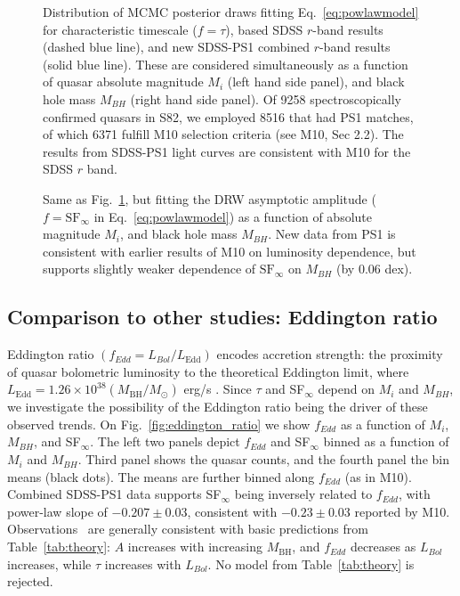 \documentclass[twocolumn]{aastex62}
\begin{document}
\begin{figure*} 
	\caption{Distribution of MCMC posterior draws fitting Eq.~\ref{eq:powlawmodel} for characteristic timescale ($f=\tau$), based SDSS $r$-band results (dashed blue line), and new SDSS-PS1 combined $r$-band results (solid blue line). These are considered simultaneously as a function of quasar absolute magnitude $M_{i}$ (left hand side panel), and black hole mass $M_{BH}$ (right hand side panel). Of 9258 spectroscopically confirmed quasars in S82, we employed 8516 that had PS1 matches, of which 6371  fulfill M10 selection criteria (see M10, Sec 2.2). The results from SDSS-PS1 light curves are consistent with M10 for the SDSS $r$ band. }
	\label{fig:drw_tau_posterior}
\end{figure*} 


\begin{figure*}
	\caption{Same as Fig.~\ref{fig:drw_tau_posterior}, but fitting the DRW asymptotic amplitude ($f = \mathrm{SF}_{\infty}$ in Eq.~\ref{eq:powlawmodel})  as a function of absolute magnitude $M_{i}$, and black hole mass $M_{BH}$. New data from PS1 is consistent with earlier results of M10 on luminosity dependence, but supports slightly weaker dependence of $\mathrm{SF}_{\infty}$ on $M_{BH}$ (by 0.06 dex).}
	\label{fig:drw_sf_posterior}
\end{figure*} 

 

\subsection{Comparison to other studies: Eddington ratio}

Eddington ratio $(f_{Edd} {=} L_{Bol}/L_{\mathrm{Edd}})$ encodes accretion strength: the proximity of quasar bolometric luminosity to the theoretical Eddington limit, where $L_{\mathrm{Edd}} {=} 1.26 {\times} 10^{38} (M_{\mathrm{BH}} / M_{\odot})$ erg/s \citep{shen2011}. Since $\tau$ and SF$_{\infty}$ depend on $M_{i}$ and $M_{BH}$, we investigate the possibility of the Eddington ratio being the driver of these observed trends. On Fig.~\ref{fig:eddington_ratio} we show $f_{Edd} $ as a function of $M_{i}$, $M_{BH}$, and SF$_{\infty}$. The left two panels depict  $f_{Edd} $ and SF$_{\infty}$ binned as a function of $M_{i}$ and $M_{BH}$. Third panel shows the quasar counts, and the fourth panel the bin means (black dots). The means are further binned along  $f_{Edd} $ (as in M10). Combined SDSS-PS1 data supports SF$_{\infty}$  being inversely related to  $f_{Edd} $, with power-law slope of $-0.207 \pm 0.03$, consistent with  $-0.23 \pm 0.03$ reported by M10. Observations \ are generally consistent with basic predictions from Table~\ref{tab:theory}: $A$ increases with increasing  $M_{\mathrm{BH}}$, and  $f_{Edd} $ decreases as $L_{Bol}$ increases, while $\tau$ increases with  $L_{Bol}$. No model from  Table~\ref{tab:theory} is rejected. 
\end{document}
